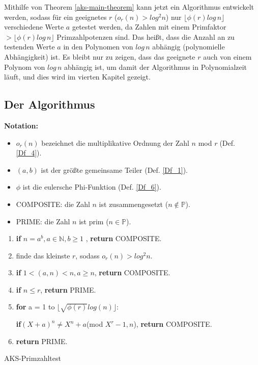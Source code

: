 \documentclass[12pt,oneside]{article}
\theoremstyle{remark}
\theoremstyle{definition}
\begin{document}
\begin{flushleft}
Mithilfe von Theorem \ref{aks-main-theorem} kann jetzt ein Algorithmus entwickelt werden, sodass für ein geeignetes $r$ ($o_{r}(n) > log^2 n$) nur $\lfloor \phi(r) log \, n \rfloor$ verschiedene Werte $a$ getestet werden, da Zahlen mit einem Primfaktor $> \lfloor \phi(r) log \, n \rfloor$  Primzahlpotenzen sind. Das heißt, dass die Anzahl an zu testenden Werte $a$ in den Polynomen von $log \, n$ abhängig (polynomielle Abhängigkeit) ist. Es bleibt nur zu zeigen, dass das geeignete $r$ auch von einem Polynom von $log \, n$ abhängig ist, um damit der Algorithmus in Polynomialzeit läuft, und dies wird im vierten Kapitel gezeigt.  






\newpage

\end{flushleft}
\subsection{Der Algorithmus}\label{algo}
\textbf{Notation:}
\begin{itemize}
    \item $o_r(n)$ bezeichnet die multiplikative Ordnung der Zahl $n$ mod $r \; $(Def. \ref{Df_4}).
    \item $(a,b)$ ist der größte gemeinsame Teiler (Def. \ref{Df_1}).
\item $\phi$ ist die eulersche Phi-Funktion (Def. \ref{Df_6}).

\item COMPOSITE: die Zahl $n$ ist zusammengesetzt ($n \not \in \mathbb{P}$).

\item PRIME: die Zahl $n$ ist prim ($n \in \mathbb{P}$).
\end{itemize}
\begin{algorithm}[H]
\SetAlgoLined
{}

\begin{enumerate}
\item \textbf{if} $n = a^b, a \in \mathbb{N}, b \geq 1$ , \textbf{return} COMPOSITE.
\item  finde das kleinste $r$, sodass $o_{r}(n) > log^2 n $.
\item \textbf{if} $1 < (a,n) < n, a \geq n $, \textbf{return} COMPOSITE.
\item \textbf{if} $n \leq r $, \textbf{return} PRIME.
\item \textbf{for} a = 1 to $\lfloor \sqrt{\phi(r)}log(n) \rfloor$:

 \textbf{if}$(X + a)^n \neq X^n + a $(mod $X^r - 1, n$), \textbf{return} COMPOSITE.
 \item \textbf{return} PRIME.
\end{enumerate}
 
\caption{AKS-Primzahltest}
\end{algorithm}
\end{document}
